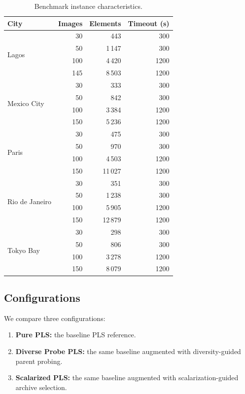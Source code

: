 \documentclass[11pt,a4paper]{article}
\begin{document}
\begin{table}[htbp]
\centering
\caption{Benchmark instance characteristics.}
\label{tab:instances}
\begin{tabular}{lrrr}
\toprule
\textbf{City} & \textbf{Images} & \textbf{Elements} & \textbf{Timeout (s)} \\
\midrule
\multirow{4}{*}{Lagos}
  & 30  &    443  & 300 \\
  & 50  &  1\,147 & 300 \\
  & 100 &  4\,420 & 1200 \\
  & 145 &  8\,503 & 1200 \\
\midrule
\multirow{4}{*}{Mexico City}
  & 30  &    333  & 300 \\
  & 50  &    842  & 300 \\
  & 100 &  3\,384 & 1200 \\
  & 150 &  5\,236 & 1200 \\
\midrule
\multirow{4}{*}{Paris}
  & 30  &    475  & 300 \\
  & 50  &    970  & 300 \\
  & 100 &  4\,503 & 1200 \\
  & 150 & 11\,027 & 1200 \\
\midrule
\multirow{4}{*}{Rio de Janeiro}
  & 30  &    351  & 300 \\
  & 50  &  1\,238 & 300 \\
  & 100 &  5\,905 & 1200 \\
  & 150 & 12\,879 & 1200 \\
\midrule
\multirow{4}{*}{Tokyo Bay}
  & 30  &    298  & 300 \\
  & 50  &    806  & 300 \\
  & 100 &  3\,278 & 1200 \\
  & 150 &  8\,079 & 1200 \\
\bottomrule
\end{tabular}
\end{table}

\subsection{Configurations}

We compare three configurations:
\begin{enumerate}
  \item \textbf{Pure PLS:} the baseline PLS reference.
  \item \textbf{Diverse Probe PLS:} the same baseline augmented with
    diversity-guided parent probing.
  \item \textbf{Scalarized PLS:} the same baseline augmented with
    scalarization-guided archive selection.
\end{enumerate}
\end{document}
